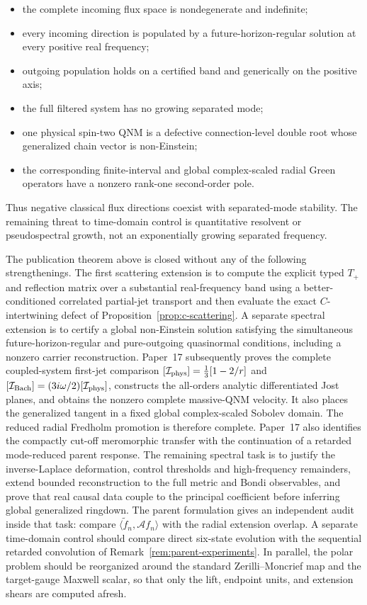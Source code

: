 \documentclass[11pt]{article}
\theoremstyle{definition}
\theoremstyle{remark}
\begin{document}
\begin{itemize}
\item the complete incoming flux space is nondegenerate and indefinite;
\item every incoming direction is populated by a future-horizon-regular
solution at every positive real frequency;
\item outgoing population holds on a certified band and generically on the
positive axis;
\item the full filtered system has no growing separated mode;
\item one physical spin-two QNM is a defective connection-level double root
whose generalized chain vector is non-Einstein;
\item the corresponding finite-interval and global complex-scaled radial
Green operators have a nonzero rank-one second-order pole.
\end{itemize}

Thus negative classical flux directions coexist with separated-mode
stability.  The remaining threat to time-domain control is quantitative
resolvent or pseudospectral growth, not an exponentially growing separated
frequency.

The publication theorem above is closed without any of the following
strengthenings.  The first scattering extension is to compute the explicit
typed \(T_+\) and reflection matrix over a substantial real-frequency band
using a better-conditioned correlated partial-jet transport and then
evaluate the exact \(C\)-intertwining defect of
Proposition~\ref{prop:c-scattering}.  A separate spectral extension is to
certify a global non-Einstein solution satisfying the simultaneous
future-horizon-regular and pure-outgoing quasinormal conditions, including a
nonzero carrier reconstruction.  Paper~17 subsequently proves the complete
coupled-system first-jet comparison
\([\mathcal I_{\rm phys}]=\frac13[1-2/r]\) and
\([\mathcal I_{\rm Bach}]=(3i\omega/2)[\mathcal I_{\rm phys}]\), constructs
the all-orders analytic differentiated Jost planes, and obtains the
nonzero complete massive-QNM velocity.  It also places the generalized
tangent in a fixed global complex-scaled Sobolev domain.  The reduced
radial Fredholm promotion is therefore complete.  Paper~17 also identifies
the compactly cut-off meromorphic transfer with the continuation of a
retarded mode-reduced parent response.  The remaining spectral task is to
justify the inverse-Laplace deformation, control thresholds and
high-frequency remainders, extend bounded reconstruction to the full metric
and Bondi observables, and prove that real causal data couple to the
principal coefficient before inferring global generalized ringdown.
The parent formulation gives an independent audit inside that task: compare
\(\langle\widetilde f_n,\mathcal Af_n\rangle\) with the radial extension
overlap.  A separate
time-domain control should compare direct six-state evolution with the
sequential retarded convolution of Remark~\ref{rem:parent-experiments}.  In
parallel, the polar problem should be reorganized around the standard
Zerilli--Moncrief map and the target-gauge Maxwell scalar, so that only the
lift, endpoint units, and extension shears are computed afresh.
\end{document}
